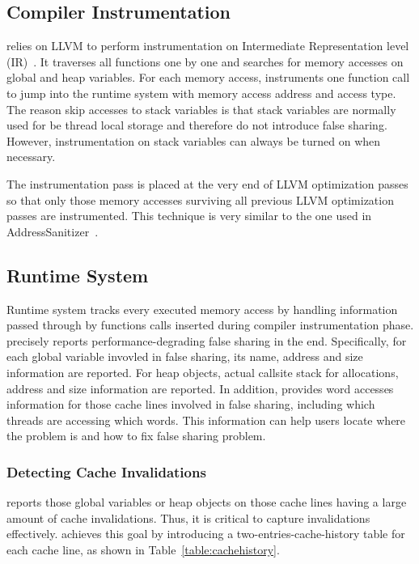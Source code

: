 \subsection{Compiler Instrumentation}
\label{sec:compiler}

\Defaults{} relies on LLVM to perform instrumentation on Intermediate Representation level (IR)~\cite{llvm}.
It traverses all functions one by one and 
searches for memory accesses on global and heap variables. 
For each memory access,  instruments one function call to 
jump into the runtime system with memory access  
address and access type.
The reason \Defaults{} skip accesses to stack variables 
is that stack variables are normally used for be thread local storage and
therefore do not introduce false sharing. However, instrumentation on stack
variables can always be turned on when necessary. 

The instrumentation pass is placed at the very end of LLVM optimization passes 
so that only those memory accesses surviving all previous 
LLVM optimization passes are instrumented. This 
technique is very similar to the one used in AddressSanitizer~\cite{Addresssanitizer}.

\subsection{Runtime System}
\label{sec:runtime}

Runtime system tracks every executed memory access by handling 
information passed through by functions calls inserted during compiler
instrumentation phase. 
 precisely reports 
performance-degrading false sharing in the end.
Specifically, for each global variable invovled in false sharing, its name, address and size
information are reported. 
For heap objects, actual callsite stack for allocations, address 
and size information are reported. 
In addition,  provides word accesses information for those cache
lines involved in false sharing, 
including which threads are accessing which words. This information can help 
users locate where the problem is and how to fix false sharing problem.

\subsubsection{Detecting Cache Invalidations}
\Defaults{} reports those global variables or heap objects on those cache lines 
having a large amount of cache invalidations. 
Thus, it is critical to capture invalidations effectively. 
\Defaults{} achieves this goal by introducing a  
two-entries-cache-history table for each cache line, as shown in Table~\ref{table:cachehistory}. 

